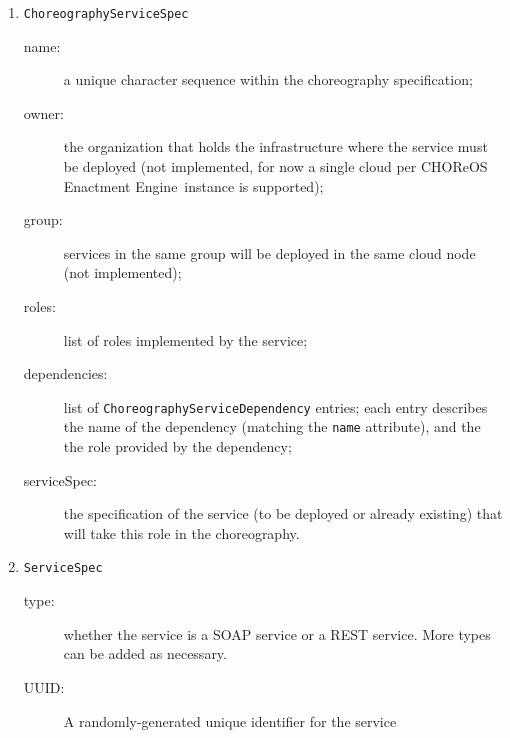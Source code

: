 \documentclass[a4paper, 10pt]{article}
\newcommand{\ee}{CHOReOS Enactment Engine}
\begin{document}
\begin{enumerate}

\item \verb!ChoreographyServiceSpec! 
	\begin{description}
		\item [name:] a unique character sequence within the choreography specification;
		\item [owner:] the organization that holds the infrastructure where the service must be deployed (not implemented, for now a single cloud per \ee\ instance is supported);
		\item [group:] services in the same group will be deployed in the same cloud node (not implemented);
		\item [roles:] list of roles implemented by the service;
		\item [dependencies:] list of \verb!ChoreographyServiceDependency! entries; each entry describes the name of the dependency (matching the \verb!name! attribute), and the the role provided by the dependency;
		\item [serviceSpec:] the specification of the service (to be deployed or already existing) that will take this role in the choreography.
	\end{description}

\item \verb!ServiceSpec!
	\begin{description}
		\item [type:] whether the service is a SOAP service or a REST service. More types can be added as necessary.
		\item [UUID:] A randomly-generated unique identifier for the service
	\end{description}


\end{enumerate}
\end{document}

